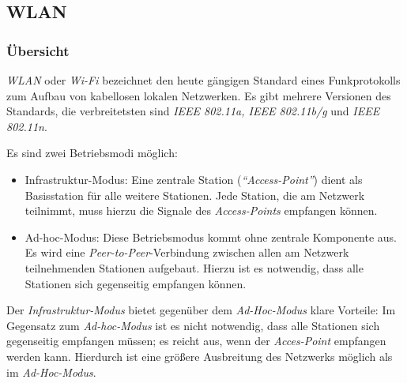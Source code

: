     \subsection{WLAN}\label{wlan}

        \subsubsection{Übersicht}
            \emph{WLAN} oder \emph{Wi-Fi} bezeichnet den heute gängigen Standard eines Funkprotokolls zum Aufbau
            von kabellosen lokalen Netzwerken. Es gibt mehrere Versionen des Standards, die verbreitetsten
            sind \emph{IEEE 802.11a, IEEE 802.11b/g} und \emph{IEEE 802.11n}. 

            Es sind zwei Betriebsmodi möglich:

            \begin{itemize}
                \item{Infrastruktur-Modus:} Eine zentrale Station (\emph{"`Access-Point"'}) dient als Basisstation
                                            für alle weitere Stationen. Jede Station, die am Netzwerk
                                            teilnimmt, muss hierzu die Signale des \emph{Access-Points} 
                                            empfangen können.
                \item{Ad-hoc-Modus:} Diese Betriebsmodus kommt ohne zentrale Komponente aus. Es wird eine
                                     \emph{Peer-to-Peer}-Verbindung zwischen allen am Netzwerk teilnehmenden 
                                     Stationen aufgebaut. Hierzu ist es notwendig, dass alle Stationen
                                     sich gegenseitig empfangen können.
            \end{itemize}

            Der \emph{Infrastruktur-Modus} bietet gegenüber dem \emph{Ad-Hoc-Modus} klare Vorteile: Im Gegensatz
            zum \emph{Ad-hoc-Modus} ist es nicht notwendig, dass alle Stationen sich gegenseitig empfangen
            müssen; es reicht aus, wenn der \emph{Acces-Point} empfangen werden kann. Hierdurch ist eine
            größere Ausbreitung des Netzwerks möglich als im \emph{Ad-Hoc-Modus}. 

